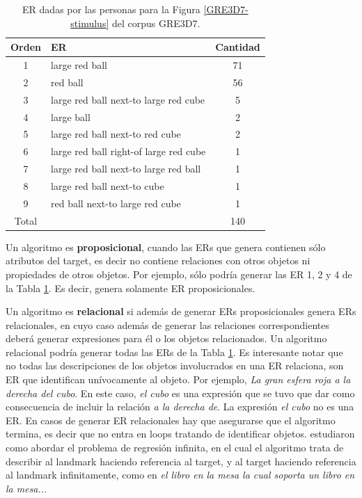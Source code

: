 \begin{table}[h!]
\begin{center}
\begin{tabular}{|c|l|c|}
\hline
 Orden&ER& Cantidad \\
\hline
1&large red ball & 71 \\
2&red ball & 56 \\ 
3&large red ball next-to large red cube & 5 \\ 
4&large ball & 2 \\ 
5&large red ball next-to red cube & 2 \\ 
6&large red ball right-of large red cube & 1 \\ 
7&large red ball next-to large red ball & 1 \\ 
8&large red ball next-to cube & 1 \\ 
9&red ball next-to large red cube & 1 \\ \hline
Total & &140 \\ \hline
\end{tabular}
\caption{ER dadas por las personas para la Figura \ref{GRE3D7-stimulus} del corpus GRE3D7.} 
\label{er-gre3d7-stimulus}
\vspace*{-.5cm}
\end{center}
\end{table}

Un algoritmo es {\bf proposicional}, cuando las ERs que genera contienen s\'olo atributos del target, es decir no contiene relaciones con otros objetos ni propiedades de otros objetos. Por ejemplo, s\'olo podr\'ia generar las ER 1, 2 y 4 de la Tabla \ref{er-gre3d7-stimulus}. Es decir, genera solamente ER proposicionales.

Un algoritmo es {\bf relacional} si adem\'as de generar ERs proposicionales genera ERs relacionales, en cuyo caso adem\'as de generar las relaciones correspondientes deber\'a generar expresiones para \'el o los objetos relacionados. Un algoritmo relacional podr\'ia generar todas las ERs de la Tabla \ref{er-gre3d7-stimulus}. Es interesante notar que no todas las descripciones de los objetos involucrados en una ER relaciona, son ER que identifican un\'ivocamente al objeto. Por ejemplo, {\it La gran esfera roja a la derecha del cubo}. En este caso, {\it el cubo} es una expresi\'on que se tuvo que dar como consecuencia de incluir la relaci\'on {\it a la derecha de}. La expresi\'on {\it el cubo} no es una ER. En casos de generar ER relacionales hay que asegurarse que el algoritmo termina, es decir que no entra en loops tratando de identificar objetos. \cite{haddock} estudiaron como abordar el problema de regresi\'on infinita, en el cual el algoritmo trata de describir al landmark haciendo referencia al target, y al target haciendo referencia al landmark infinitamente, como en {\it el libro en la mesa la cual soporta un libro en la mesa... }

